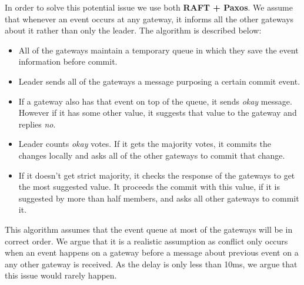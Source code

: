 \documentclass[12pt]{article}
\begin{document}
In order to solve this potential issue we use both \textbf{RAFT + Paxos}. We assume that 
whenever an event occurs at any gateway, it informs all the other gateways about it rather 
than only the leader. The algorithm is described below: 
\begin{itemize}
	\item  All of the gateways maintain a temporary queue in which they save the 
	event information before commit. 
	\item Leader sends all of the gateways a message purposing a certain commit event. 
	\item If a gateway also has that event on top of the queue, it sends \textit{okay} message. However if it has some other value, it suggests that value to the gateway and replies \textit{no}. 
	\item Leader counts \textit{okay} votes. If it gets the majority votes, it commits the changes 
	locally and asks all of the other gateways to commit that change. 
	\item If it doesn't get strict majority, it checks the response of the gateways to get the most 
	suggested value. It proceeds the commit with this value, if it is suggested by more than half members, and asks all other gateways to commit it. 
\end{itemize}

This algorithm assumes that the event queue at most of the gateways will be in correct order. 
We argue that it is a realistic assumption as conflict only occurs when an event happens on a gateway 
before a message about previous event on a any other gateway is received. As the delay is only less 
than 10ms, we argue that this issue would rarely happen. 


\end{document}

